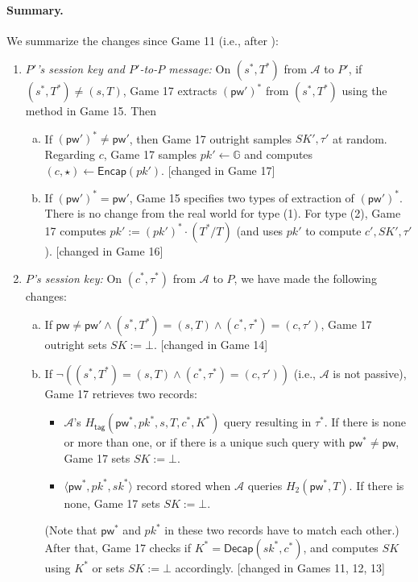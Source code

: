 \documentclass{article}
\theoremstyle{plain}
\theoremstyle{definition}
\theoremstyle{remark}
\newcommand{\group}{\mathbb{G}}
\newcommand{\adv}{\mathcal{A}}
\newcommand{\Encap}{\mathsf{Encap}}
\newcommand{\Decap}{\mathsf{Decap}}
\newcommand{\Htag}{H_\mathsf{tag}}
\newcommand{\pw}{\mathsf{pw}}
\begin{document}
\paragraph{Summary.}
We summarize the changes since Game 11 (i.e., after ):
\begin{enumerate}
  \item \emph{$P'$'s session key and $P'$-to-$P$ message:} On $(s^*,T^*)$ from $\adv$ to $P'$, if $(s^*,T^*) \neq (s,T)$, Game 17 extracts $(\pw')^*$ from $(s^*,T^*)$ using the method in Game 15. Then
      \begin{enumerate}[(a)]
        \item If $(\pw')^* \neq \pw'$, then Game 17 outright samples $SK',\tau'$ at random. Regarding $c$, Game 17 samples $pk' \gets \group$ and computes $(c,\star) \gets \Encap(pk')$. [changed in Game 17]
        \item If $(\pw')^* = \pw'$, Game 15 specifies two types of extraction of $(\pw')^*$. There is no change from the real world for type (1). For type (2), Game 17 computes $pk' := (pk')^* \cdot (T^*/T)$ (and uses $pk'$ to compute $c',SK',\tau'$). [changed in Game 16]
      \end{enumerate}
  \item \emph{$P$'s session key:} On $(c^*,\tau^*)$ from $\adv$ to $P$, we have made the following changes:
      \begin{enumerate}[(a)]
        \item If $\pw \neq \pw' \land (s^*,T^*) = (s,T) \land (c^*,\tau^*) = (c,\tau')$, Game 17 outright sets $SK := \bot$. [changed in Game 14]
        \item If $\neg((s^*,T^*) = (s,T) \land (c^*,\tau^*) = (c,\tau'))$ (i.e., $\adv$ is not passive), Game 17 retrieves two records:
            \begin{itemize}
              \item $\adv$'s $\Htag(\pw^*,pk^*,s,T,c^*,K^*)$ query resulting in $\tau^*$. If there is none or more than one, or if there is a unique such query with $\pw^* \neq \pw$, Game 17 sets $SK := \bot$.
              \item $\langle\pw^*,pk^*,sk^*\rangle$ record stored when $\adv$ queries $H_2(\pw^*,T)$. If there is none, Game 17 sets $SK := \bot$.
            \end{itemize}
            (Note that $\pw^*$ and $pk^*$ in these two records have to match each other.) After that, Game 17 checks if $K^* = \Decap(sk^*,c^*)$, and computes $SK$ using $K^*$ or sets $SK := \bot$ accordingly. [changed in Games 11, 12, 13]
       \end{enumerate}
\end{enumerate}
\end{document}
